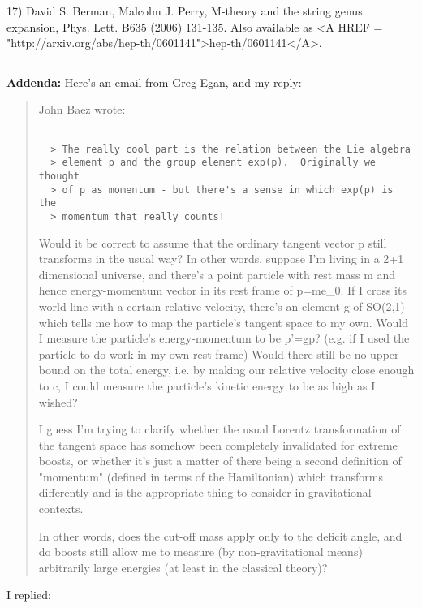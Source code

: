 17) David S. Berman, Malcolm J. Perry, M-theory and the string genus
expansion, Phys. Lett. B635 (2006) 131-135.  Also available as 
<A HREF = "http://arxiv.org/abs/hep-th/0601141">hep-th/0601141</A>.


\par\noindent\rule{\textwidth}{0.4pt}
\textbf{Addenda:} Here's an email from Greg Egan, and my reply:

\begin{quote}
  John Baez wrote:


\begin{verbatim}

  > The really cool part is the relation between the Lie algebra 
  > element p and the group element exp(p).  Originally we thought 
  > of p as momentum - but there's a sense in which exp(p) is the 
  > momentum that really counts!
\end{verbatim}
    

  Would it be correct to assume that the ordinary tangent vector p still
  transforms in the usual way?  In other words, suppose I'm living in a
  2+1 dimensional universe, and there's a point particle with rest mass m
  and hence energy-momentum vector in its rest frame of p=me_{0}.  If I
  cross its world line with a certain relative velocity, there's an
  element g of SO(2,1) which tells me how to map the particle's tangent
  space to my own.  Would I measure the particle's energy-momentum to be
  p'=gp?  (e.g. if I used the particle to do work in my own rest frame)
  Would there still be no upper bound on the total energy, i.e. by making
  our relative velocity close enough to c, I could measure the particle's
  kinetic energy to be as high as I wished?

  I guess I'm trying to clarify whether the usual Lorentz transformation
  of the tangent space has somehow been completely invalidated for
  extreme boosts, or whether it's just a matter of there being a second
  definition of "momentum" (defined in terms of the Hamiltonian) which
  transforms differently and is the appropriate thing to consider in
  gravitational contexts.

  In other words, does the cut-off mass apply only to the deficit angle,
  and do boosts still allow me to measure (by non-gravitational means)
  arbitrarily large energies (at least in the classical theory)?
\end{quote}

I replied:

